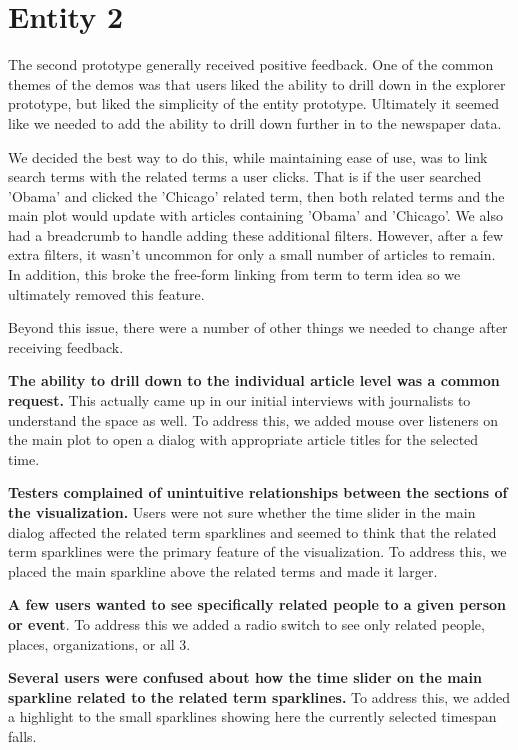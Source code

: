 \section{Entity 2}

The second prototype generally received positive feedback. One of the common themes of the demos was that users liked the ability to drill down in the explorer prototype, but liked the simplicity of the entity prototype. Ultimately it seemed like we needed to add the ability to drill down further in to the newspaper data.

We decided the best way to do this, while maintaining ease of use, was to link search terms with the related terms a user clicks. That is if the user searched 'Obama' and clicked the 'Chicago' related term, then both related terms and the main plot would update with articles containing 'Obama' and 'Chicago'. We also had a breadcrumb to handle adding these additional filters. However, after a few extra filters, it wasn't uncommon for only a small number of articles to remain. In addition, this broke the free-form linking from term to term idea so we ultimately removed this feature.

Beyond this issue, there were a number of other things we needed to change after receiving feedback.

\textbf{The ability to drill down to the individual article level was a common request.} This actually came up in our initial interviews with journalists to understand the space as well. To address this, we added mouse over listeners on the main plot to open a dialog with appropriate article titles for the selected time.

\textbf{Testers complained of unintuitive relationships between the sections of the visualization.} Users were not sure whether the time slider in the main dialog affected the related term sparklines and seemed to think that the related term sparklines were the primary feature of the visualization. To address this, we placed the main sparkline above the related terms and made it larger.

\textbf{A few users wanted to see specifically related people to a given person or event}. To address this we added a radio switch to see only related people, places, organizations, or all 3.

\textbf{Several users were confused about how the time slider on the main sparkline related to the related term sparklines.} To address this, we added a highlight to the small sparklines showing here the currently selected timespan falls. 

